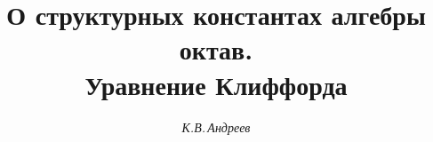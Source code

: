 




%





\newcommand{\Spin}{\operatorname{Spin}}


\newcommand{\tts}[1]{}







\setcounter{page}{3}















\author{\it К.В.\,Андреев}




\title{О структурных константах алгебры октав.\\ Уравнение Клиффорда}





\date{}




\pagestyle{plain} %







\maketitle


\label{begin}






